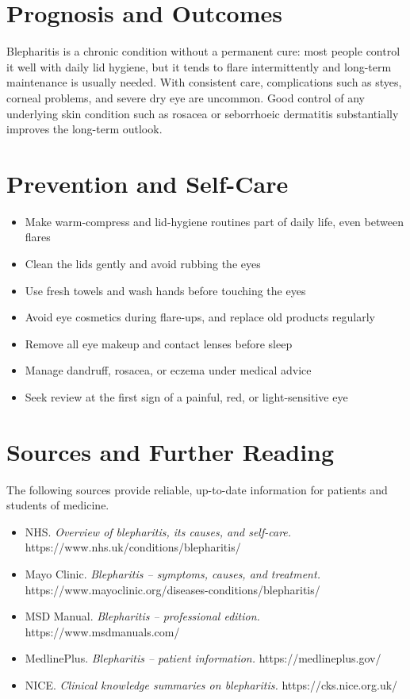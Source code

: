 \section*{Prognosis and Outcomes}
Blepharitis is a chronic condition without a permanent cure: most people control it well with daily lid hygiene, but it tends to flare intermittently and long-term maintenance is usually needed. With consistent care, complications such as styes, corneal problems, and severe dry eye are uncommon. Good control of any underlying skin condition such as rosacea or seborrhoeic dermatitis substantially improves the long-term outlook.

\section*{Prevention and Self-Care}
\begin{itemize}
    \item Make warm-compress and lid-hygiene routines part of daily life, even between flares
    \item Clean the lids gently and avoid rubbing the eyes
    \item Use fresh towels and wash hands before touching the eyes
    \item Avoid eye cosmetics during flare-ups, and replace old products regularly
    \item Remove all eye makeup and contact lenses before sleep
    \item Manage dandruff, rosacea, or eczema under medical advice
    \item Seek review at the first sign of a painful, red, or light-sensitive eye
\end{itemize}

\section*{Sources and Further Reading}
The following sources provide reliable, up-to-date information for patients and students of medicine.

\begin{itemize}
    \item NHS. \textit{Overview of blepharitis, its causes, and self-care.} https://www.nhs.uk/conditions/blepharitis/
    \item Mayo Clinic. \textit{Blepharitis -- symptoms, causes, and treatment.} https://www.mayoclinic.org/diseases-conditions/blepharitis/
    \item MSD Manual. \textit{Blepharitis -- professional edition.} https://www.msdmanuals.com/
    \item MedlinePlus. \textit{Blepharitis -- patient information.} https://medlineplus.gov/
    \item NICE. \textit{Clinical knowledge summaries on blepharitis.} https://cks.nice.org.uk/
\end{itemize}
